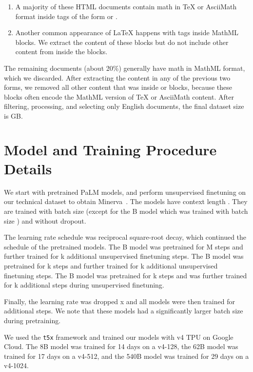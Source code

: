\documentclass{article}
\newcommand{\ourmodel}[0]{{Minerva~}}
\newcommand{\pretrainedmodel}{{PaLM }}
\begin{document}
\begin{enumerate}
\item
A majority of these HTML documents contain math in TeX or AsciiMath format inside tags of the form  or .
\item
Another common appearance of \LaTeX{} happens with   tags inside  MathML blocks. We extract the content of these  blocks but do not include other content from inside the  blocks. 
\end{enumerate}
The remaining documents (about 20\%) generally have math in MathML format, which we discarded. After extracting the content in any of the previous two forms, we removed all other content that was inside   or  blocks, because these blocks often encode the MathML version of TeX or AsciiMath content.
After filtering, processing,
and selecting only English documents, the final dataset size is GB.


\section{Model and Training Procedure Details}
\label{appendix:training_details}

We start with pretrained \pretrainedmodel models, and perform unsupervised finetuning on our technical dataset to obtain \ourmodel\!.
The models have context length . They are trained with batch size  (except for the B model which was trained with batch size ) and without dropout.

The learning rate schedule was reciprocal square-root decay, which continued the schedule of the pretrained models. 
The B model was pretrained for M steps and further trained for k additional unsupervised finetuning steps. The B model was pretrained for k steps and further trained for k additional unsupervised finetuning steps.
 The B model was pretrained for k steps and was further trained for k additional steps during unsupervised finetuning.

Finally, the learning rate was dropped x and all models were then trained for  additional steps.  We note that these models had a significantly larger batch size during pretraining.

We used the \texttt{t5x} framework \citep{t5x} and trained our models with v4 TPU on Google Cloud. The 8B model was trained for 14 days on a 
v4-128, the 62B model was trained for 17 days on a v4-512, and the 540B model was trained for 29 days on a v4-1024.
\end{document}
